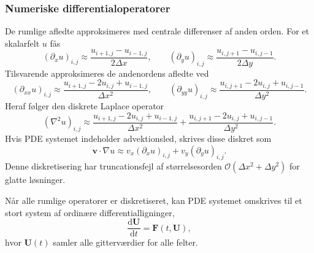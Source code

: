 \subsubsection{Numeriske differentialoperatorer}
De rumlige afledte approksimeres med centrale differenser af anden orden. For et skalarfelt $u$ fås
\begin{equation}
    \left(\partial_x u\right)_{i,j}
    \approx
    \frac{u_{i+1,j}-u_{i-1,j}}{2\Delta x},
    \qquad
    \left(\partial_y u\right)_{i,j}
    \approx
    \frac{u_{i,j+1}-u_{i,j-1}}{2\Delta y}.
    \label{eq:central_first_order}
\end{equation}
Tilsvarende approksimeres de andenordens afledte ved
\begin{equation}
    \left(\partial_{xx} u\right)_{i,j}
    \approx
    \frac{u_{i+1,j}-2u_{i,j}+u_{i-1,j}}{\Delta x^2},
    \qquad
    \left(\partial_{yy} u\right)_{i,j}
    \approx
    \frac{u_{i,j+1}-2u_{i,j}+u_{i,j-1}}{\Delta y^2}.
    \label{eq:central_second_order}
\end{equation}
Heraf følger den diskrete Laplace operator
\[
    (\nabla^2 u)_{i,j}
    \approx
    \frac{u_{i+1,j}-2u_{i,j}+u_{i-1,j}}{\Delta x^2}
    +
    \frac{u_{i,j+1}-2u_{i,j}+u_{i,j-1}}{\Delta y^2}.
\]
Hvis PDE systemet indeholder advektionsled, skrives disse diskret som
\[
    \mathbf{v}\cdot\nabla u
    \approx
    v_x \left(\partial_x u\right)_{i,j}
    +
    v_y \left(\partial_y u\right)_{i,j}.
\]
Denne diskretisering har truncationsfejl af størrelsesorden $\mathcal{O}(\Delta x^2+\Delta y^2)$ for glatte løsninger.

Når alle rumlige operatorer er diskretiseret, kan PDE systemet omskrives til et stort system af ordinære differentialligninger,
\begin{equation}
    \frac{\mathrm{d}\mathbf{U}}{\mathrm{d}t} = \mathbf{F}(t,\mathbf{U}),
    \label{eq:mol_system}
\end{equation}
hvor $\mathbf{U}(t)$ samler alle gitterværdier for alle felter.

